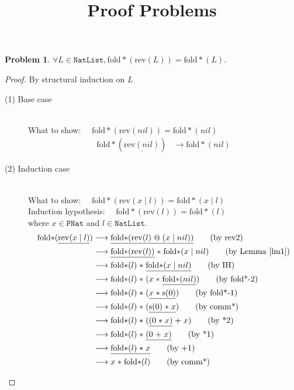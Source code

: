 \documentclass[12pt, a4paper]{article}
\title{Proof Problems}
\date{\vspace{-5ex}}
\newtheorem{problem}{Problem}
\begin{document}
\maketitle

\begin{problem}
$\forall L \in \mathtt{NatList}, \mathrm{fold*}(\mathrm{rev}(L)) = \mathrm{fold*}(L).$
\end{problem}
\begin{proof}
By structural induction on $L$

\begin{description}

\item[(1) Base case]~\\
\noindent
What to show: $\quad\mathrm{fold*}(\mathrm{rev}(nil)) = \mathrm{fold*}(nil)$
\begin{align*}
\mathrm{fold*}(\underline{\mathrm{rev}(nil)}) &\longrightarrow \mathrm{fold*}(nil) \tag{by rev1}
\end{align*}

\item[(2) Induction case]~\\
What to show: $\quad\mathrm{fold*}(\mathrm{rev}(x \mathrel{|} l)) = \mathrm{fold*}(x \mathrel{|} l)$\\
Induction hypothesis: $\quad\mathrm{fold*}(\mathrm{rev}(l)) = \mathrm{fold*}(l)$\\
where $x \in \mathtt{PNat}$ and $l \in \mathtt{NatList}.$
\begin{align*}
\mathrm{fold*}(\underline{\mathrm{rev}(x \mathrel{|} l)}) &\longrightarrow \underline{\mathrm{fold*}(\mathrm{rev}(l)\mathrel{@}(x \mathrel{|} nil))} \tag{by rev2} \\
&\longrightarrow \underline{\mathrm{fold*}(\mathrm{rev}(l))} \mathrel{*} \mathrm{fold*}(x \mathrel{|} nil) \tag{by Lemma~\ref{lm1}} \\
&\longrightarrow \mathrm{fold*}(l) \mathrel{*} \underline{\mathrm{fold*}(x \mathrel{|} nil)} \tag{by IH} \\
&\longrightarrow \mathrm{fold*}(l) \mathrel{*} (x \mathrel{*} \underline{\mathrm{fold*}(nil)}) \tag{by fold*-2} \\
&\longrightarrow \mathrm{fold*}(l) \mathrel{*} (\underline{x \mathrel{*} \mathrm{s}(0)}) \tag{by fold*-1} \\
&\longrightarrow \mathrm{fold*}(l) \mathrel{*} (\underline{\mathrm{s}(0) \mathrel{*} x}) \tag{by comm*} \\
&\longrightarrow \mathrm{fold*}(l) \mathrel{*} (\underline{(0 \mathrel{*} x)} \mathrel{+} x) \tag{by *2} \\
&\longrightarrow \mathrm{fold*}(l) \mathrel{*} \underline{(0 \mathrel{+} x)} \tag{by *1} \\
&\longrightarrow \underline{\mathrm{fold*}(l) \mathrel{*} x} \tag{by +1} \\
&\longrightarrow x \mathrel{*} \mathrm{fold*}(l) \tag{by comm*}
\end{align*}

\end{description}
\end{proof}
\end{document}
